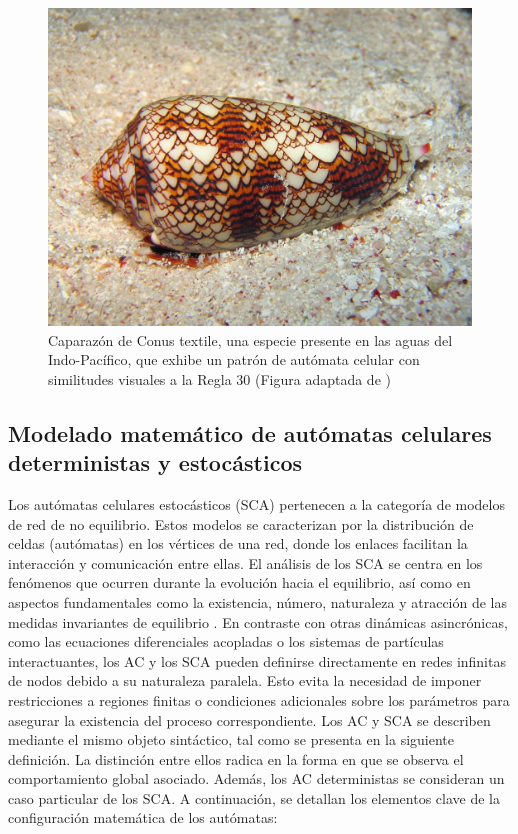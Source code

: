 \begin{figure}[h!]
	\centering\includegraphics[width=\imsize]{Textile_cone}
	\caption[C Caparazón de Conus textile, una especie presente en las aguas del Indo-Pacífico, que exhibe un patrón de autómata celular con similitudes visuales a la Regla 30.]{ Caparazón de Conus textile, una especie presente en las aguas del Indo-Pacífico, que exhibe un patrón de autómata celular con similitudes visuales a la Regla 30 (Figura adaptada de \protect\cite{ling_english_2005})} \label{fig:conus}
\end{figure}


\subsection{Modelado matemático de autómatas celulares deterministas y estocásticos}\label{sec:SCA}

Los autómatas celulares estocásticos (SCA) pertenecen a la categoría de modelos de red de no equilibrio. Estos modelos se caracterizan por la distribución de celdas (autómatas) en los vértices de una red, donde los enlaces facilitan la interacción y comunicación entre ellas. El análisis de los SCA se centra en los fenómenos que ocurren durante la evolución hacia el equilibrio, así como en aspectos fundamentales como la existencia, número, naturaleza y atracción de las medidas invariantes  de equilibrio \cite{louis_probabilistic_2018}.   En contraste con otras dinámicas asincrónicas, como las ecuaciones diferenciales acopladas o los sistemas de partículas interactuantes, los AC y los SCA pueden definirse directamente en redes infinitas de nodos debido a su naturaleza paralela. Esto evita la necesidad de imponer restricciones a regiones finitas o condiciones adicionales sobre los parámetros para asegurar la existencia del proceso correspondiente. Los AC y SCA se describen mediante el mismo objeto sintáctico, tal como se presenta en la siguiente definición. La distinción entre ellos radica en la forma en que se observa el comportamiento global asociado. Además, los AC deterministas se consideran un caso particular de los SCA. A continuación, se detallan los elementos clave de la configuración matemática de los autómatas:


